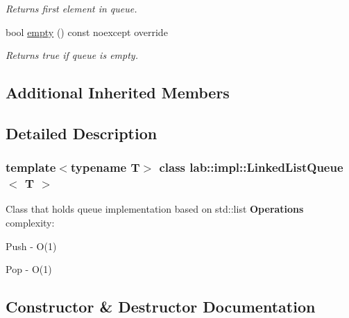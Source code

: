 \begin{DoxyCompactItemize}
\begin{DoxyCompactList}\small\item\em Returns first element in queue. \end{DoxyCompactList}\item 
\mbox{\label{classlab_1_1impl_1_1LinkedListQueue_a5fa5d5a7aa41d1bcb1e034fd149c1d5b}} 
bool \hyperlink{classlab_1_1impl_1_1LinkedListQueue_a5fa5d5a7aa41d1bcb1e034fd149c1d5b}{empty} () const noexcept override
\begin{DoxyCompactList}\small\item\em Returns true if queue is empty. \end{DoxyCompactList}\end{DoxyCompactItemize}
\subsection*{Additional Inherited Members}


\subsection{Detailed Description}
\subsubsection*{template$<$typename T$>$\newline
class lab\+::impl\+::\+Linked\+List\+Queue$<$ T $>$}

Class that holds queue implementation based on std\+::list {\bfseries Operations} complexity\+: 

\begin{DoxyItemize}
\item Push -\/ O(1) \item Pop -\/ O(1) \end{DoxyItemize}


\subsection{Constructor \& Destructor Documentation}
\mbox{\label{classlab_1_1impl_1_1LinkedListQueue_a6fbacc0f7c5c741b048326c73b761b36}} 
